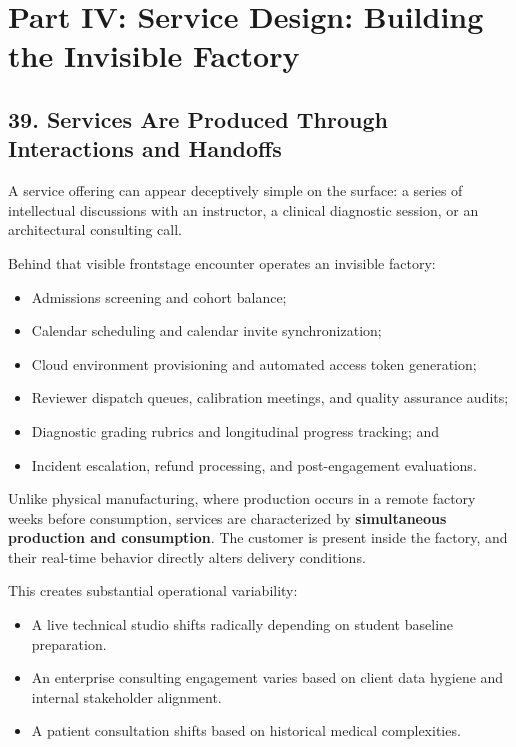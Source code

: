 \section*{Part IV: Service Design: Building the Invisible Factory}

\subsection*{39. Services Are Produced Through Interactions and Handoffs}

A service offering can appear deceptively simple on the surface: a series of intellectual discussions with an instructor, a clinical diagnostic session, or an architectural consulting call.

Behind that visible frontstage encounter operates an invisible factory:
\begin{itemize}
    \item Admissions screening and cohort balance;
    \item Calendar scheduling and calendar invite synchronization;
    \item Cloud environment provisioning and automated access token generation;
    \item Reviewer dispatch queues, calibration meetings, and quality assurance audits;
    \item Diagnostic grading rubrics and longitudinal progress tracking; and
    \item Incident escalation, refund processing, and post-engagement evaluations.
\end{itemize}

Unlike physical manufacturing, where production occurs in a remote factory weeks before consumption, services are characterized by \textbf{simultaneous production and consumption}. The customer is present inside the factory, and their real-time behavior directly alters delivery conditions.

This creates substantial operational variability:
\begin{itemize}
    \item A live technical studio shifts radically depending on student baseline preparation.
    \item An enterprise consulting engagement varies based on client data hygiene and internal stakeholder alignment.
    \item A patient consultation shifts based on historical medical complexities.
\end{itemize}

